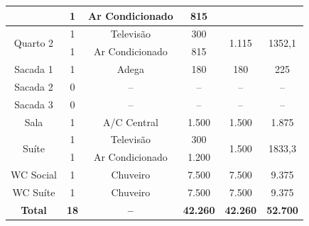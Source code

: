 \documentclass[12pt,openright,oneside,a4paper,brazil]{abntex2}
\begin{document}
\begin{table}[H]
\begin{sideways}
\begin{minipage}{\textheight}
\begin{tabular}{cccccc}
        & 1                                & Ar Condicionado        & 815                        &                         &                           \\
        \midrule
        \multirow{2}{*}{Quarto 2}          & 1                                & Televisão              & 300                        & \multirow{2}{*}{1.115}  & \multirow{2}{*}{1352,1}  \\
        & 1                                & Ar Condicionado        & 815                        &                         &                           \\
        \midrule
        Sacada 1                           & 1                      & Adega        & 180              & 180                     & 225                       \\
        \midrule
        Sacada 2                           & 0                                & --                      & --                          & --                       & --                         \\
        \midrule
        Sacada 3                           & 0                                & --                      & --                          & --                       & --                         \\
        \midrule
        Sala                               & 1                                & A/C Central            & 1.500                      & 1.500                   & 1.875                     \\
        \midrule
        \multirow{2}{*}{Suíte}             & 1                                & Televisão              & 300                        & \multirow{2}{*}{1.500}  & \multirow{2}{*}{1833,3}    \\
        & 1                                & Ar Condicionado        & 1.200                      &                         &                           \\
        \midrule
        WC Social                          & 1                                & Chuveiro               & 7.500                      & 7.500                   & 9.375                     \\
        \midrule
        WC Suíte                           & 1                                & Chuveiro               & 7.500                      & 7.500                   & 9.375                     \\
        \midrule \rowcolor[HTML]{ffc187}
        \textbf{Total}                     & \textbf{18}                      & \textbf{--}            & \textbf{42.260}            & \textbf{42.260}         & \textbf{52.700}          \\
        \bottomrule


\end{tabular}
\end{minipage}
\end{sideways}
\end{table}
\end{document}
